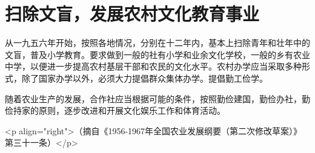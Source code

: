 \section[扫除文盲，发展农村文化教育事业（一九五六年）]{扫除文盲，发展农村文化教育事业}


从一九五六年开始，按照各地情况，分别在十二年内，基本上扫除青年和壮年中的文盲，普及小学教育。要求做到一般的社有小学和业余文化学校，一般的乡有农业中学，以便进一步提高农村基层干部和农民的文化水平。农村办学应当采取多种形式，除了国家办学以外，必须大力提倡群众集体办学。提倡勤工俭学。

随着农业生产的发展，合作社应当根据可能的条件，按照勤俭建国，勤俭办社，勤俭持家的原则，逐步改进和开展文化娱乐工作和体育活动。

<p align="right">（摘自《1956-1967年全国农业发展纲要（第二次修改草案）》第三十一条）</p>


